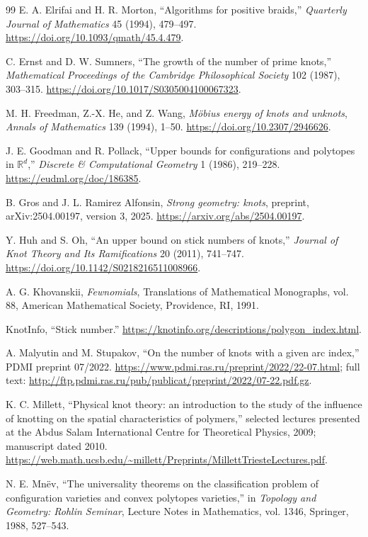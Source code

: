 \documentclass[11pt]{article}
\theoremstyle{remark}
\theoremstyle{plain}
\newcommand{\R}{\mathbb{R}}
\begin{document}
\begin{thebibliography}{99}
E. A. Elrifai and H. R. Morton,
``Algorithms for positive braids,''
\emph{Quarterly Journal of Mathematics} 45 (1994), 479--497.
\url{https://doi.org/10.1093/qmath/45.4.479}.

C. Ernst and D. W. Sumners,
``The growth of the number of prime knots,''
\emph{Mathematical Proceedings of the Cambridge Philosophical Society} 102
(1987), 303--315.
\url{https://doi.org/10.1017/S0305004100067323}.

M. H. Freedman, Z.-X. He, and Z. Wang,
\emph{M\"obius energy of knots and unknots},
\emph{Annals of Mathematics} 139 (1994), 1--50.
\url{https://doi.org/10.2307/2946626}.

J. E. Goodman and R. Pollack,
``Upper bounds for configurations and polytopes in \(\R^d\),''
\emph{Discrete \& Computational Geometry} 1 (1986), 219--228.
\url{https://eudml.org/doc/186385}.

B. Gros and J. L. Ramirez Alfonsin,
\emph{Strong geometry: knots},
preprint, arXiv:2504.00197, version 3, 2025.
\url{https://arxiv.org/abs/2504.00197}.

Y. Huh and S. Oh,
``An upper bound on stick numbers of knots,''
\emph{Journal of Knot Theory and Its Ramifications} 20 (2011), 741--747.
\url{https://doi.org/10.1142/S0218216511008966}.

A. G. Khovanskii,
\emph{Fewnomials},
Translations of Mathematical Monographs, vol. 88,
American Mathematical Society, Providence, RI, 1991.

KnotInfo,
``Stick number.''
\url{https://knotinfo.org/descriptions/polygon_index.html}.

A. Malyutin and M. Stupakov,
``On the number of knots with a given arc index,''
PDMI preprint 07/2022.
\url{https://www.pdmi.ras.ru/preprint/2022/22-07.html}; full text:
\url{http://ftp.pdmi.ras.ru/pub/publicat/preprint/2022/07-22.pdf.gz}.

K. C. Millett,
``Physical knot theory: an introduction to the study of the influence of
knotting on the spatial characteristics of polymers,''
selected lectures presented at the Abdus Salam International Centre for
Theoretical Physics, 2009; manuscript dated 2010.
\url{https://web.math.ucsb.edu/~millett/Preprints/MillettTriesteLectures.pdf}.

N. E. Mn\"ev,
``The universality theorems on the classification problem of configuration
varieties and convex polytopes varieties,''
in \emph{Topology and Geometry: Rohlin Seminar},
Lecture Notes in Mathematics, vol. 1346, Springer, 1988, 527--543.


\end{thebibliography}
\end{document}
